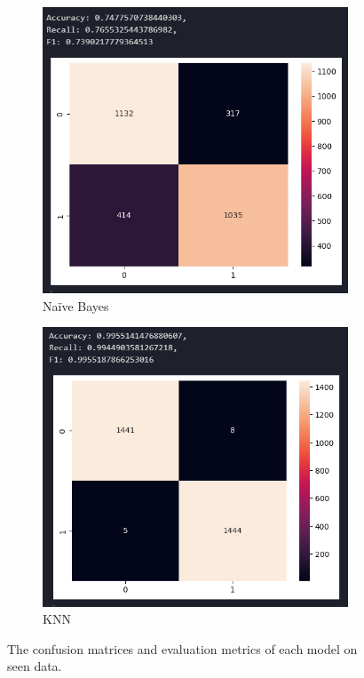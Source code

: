 \documentclass[12pt]{report}
\begin{document}
\begin{figure}[H]
    \begin{subfigure}[b]{0.45\textwidth}
        \includegraphics[width=.9\textwidth]{ModelDev/Iteration1/Matrices/Seen/MetricsIncluded/NB.png}
        \caption{Na\"ive Bayes}
        \label{fig:NBSeen}
    \end{subfigure}
    \hfill
    \begin{subfigure}[b]{0.45\textwidth}
        \includegraphics[width=.9\textwidth]{ModelDev/Iteration1/Matrices/Seen/MetricsIncluded/KNN.png}
        \caption{KNN}
        \label{fig:KNNSeen}
    \end{subfigure}
    \caption{The confusion matrices and evaluation metrics of each model on seen data.}
    \label{fig:SeenDataMatrices}
\end{figure}
\end{document}
